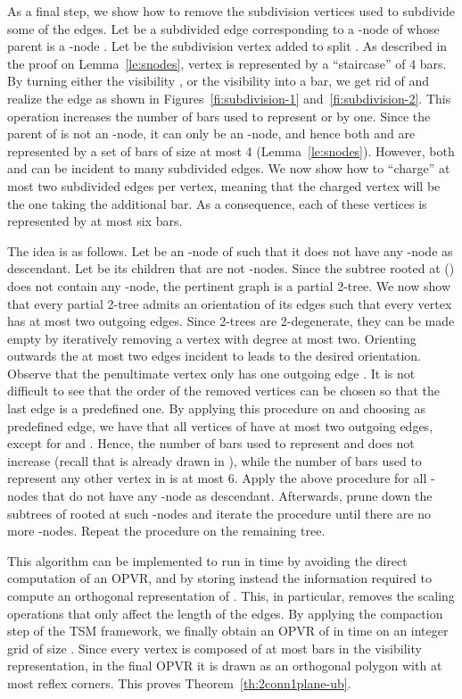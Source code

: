 \documentclass{article}
\newcommand{\opvr}{OPVR\xspace}
\begin{document}
As a final step, we show how to remove the subdivision vertices used to subdivide some of the edges. Let  be a subdivided edge corresponding to a -node of  whose parent is a -node . Let  be the subdivision vertex added to split . As described in the proof on Lemma~\ref{le:snodes}, vertex  is represented by a ``staircase'' of 4 bars. By turning either the visibility , or the visibility  into a bar, we get rid of  and realize the edge  as shown in Figures~\ref{fi:subdivision-1} and~\ref{fi:subdivision-2}. This operation increases  the number of bars used to represent  or  by one. Since the parent of  is not an -node, it can only be an -node, and hence both  and  are represented by a set of bars of size at most 4 (Lemma~\ref{le:snodes}). However, both  and  can be incident to many subdivided edges. We now show how to ``charge'' at most two subdivided edges per vertex, meaning that the charged vertex will be the one taking the additional bar. As a consequence, each of these vertices is represented by at most six bars.




The idea is as follows. Let  be an -node of  such that it does not have any -node as descendant. Let  be its children that are not -nodes. Since the subtree  rooted at  () does not contain any -node, the pertinent graph  is a partial 2-tree. We now show that every partial 2-tree admits an orientation of its edges such that every vertex has at most two outgoing edges. Since 2-trees are 2-degenerate, they can be made empty by iteratively removing a vertex  with degree at most two. Orienting outwards the at most two  edges incident to  leads to the desired orientation. Observe that the penultimate vertex only has one outgoing edge . It is not difficult to see that the order of the removed vertices can be chosen so that the last edge  is a predefined one. By applying this procedure on  and choosing  as predefined edge, we have that all vertices of  have at most two outgoing edges, except for  and . Hence, the number of bars used to represent  and  does not increase (recall that  is already drawn in ), while the number of bars used to represent any other vertex in  is at most 6. Apply the above procedure for all -nodes that do not have any -node as descendant. Afterwards, prune down the subtrees of  rooted at such -nodes and iterate the procedure until there are no more -nodes. Repeat the procedure on the remaining tree.

This algorithm can be implemented to run in  time by avoiding the direct computation of an \opvr, and by storing instead the information required to compute an orthogonal representation  of . This, in particular, removes the scaling operations that only affect the length of the edges. By applying the compaction step of the TSM framework, we finally obtain an \opvr of  in  time on an integer grid of size . Since every vertex is composed of at most  bars in the visibility representation, in the final \opvr it is drawn as an orthogonal polygon with at most  reflex corners.  This proves Theorem~\ref{th:2conn1plane-ub}.
\end{document}
